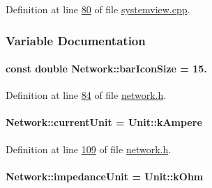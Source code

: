 Definition at line \hyperlink{systemview_8cpp_source_l00080}{80} of file \hyperlink{systemview_8cpp_source}{systemview.\+cpp}.



\subsubsection{Variable Documentation}
\hypertarget{group___graphics_gaa334bbc93b3fde219840e95e23198b53}{}
\paragraph[{bar\+Icon\+Size}]{\setlength{\rightskip}{0pt plus 5cm}const double Network\+::bar\+Icon\+Size = 15.\hspace{0.3cm}{\ttfamily [static]}}\label{group___graphics_gaa334bbc93b3fde219840e95e23198b53}


Definition at line \hyperlink{network_8h_source_l00084}{84} of file \hyperlink{network_8h_source}{network.\+h}.

\hypertarget{group___graphics_gac6a26db5fef2b1dd2a00faf6340d1702}{}
\paragraph[{current\+Unit}]{ Network\+::current\+Unit = {\bf Unit\+::k\+Ampere}\hspace{0.3cm}{\ttfamily [static]}}\label{group___graphics_gac6a26db5fef2b1dd2a00faf6340d1702}


Definition at line \hyperlink{network_8h_source_l00109}{109} of file \hyperlink{network_8h_source}{network.\+h}.

\hypertarget{group___graphics_ga5f3d72699a723c64a89d22e34df708ff}{}
\paragraph[{impedance\+Unit}]{ Network\+::impedance\+Unit = {\bf Unit\+::k\+Ohm}\hspace{0.3cm}{\ttfamily [static]}}\label{group___graphics_ga5f3d72699a723c64a89d22e34df708ff}


